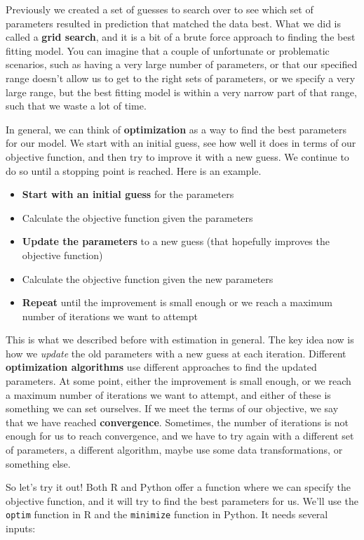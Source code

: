 \documentclass[
  letterpaper,
]{krantz}
\providecommand{\tightlist}{%
  \setlength{\itemsep}{0pt}\setlength{\parskip}{0pt}}\usepackage{longtable,booktabs,array}
\begin{document}
Previously we created a set of guesses to search over to see which set
of parameters resulted in prediction that matched the data best. What we
did is called a \textbf{grid search}, and it is a bit of a brute force
approach to finding the best fitting model. You can imagine that a
couple of unfortunate or problematic scenarios, such as having a very
large number of parameters, or that our specified range doesn't allow us
to get to the right sets of parameters, or we specify a very large
range, but the best fitting model is within a very narrow part of that
range, such that we waste a lot of time.

In general, we can think of \textbf{optimization} as a way to find the
best parameters for our model. We start with an initial guess, see how
well it does in terms of our objective function, and then try to improve
it with a new guess. We continue to do so until a stopping point is
reached. Here is an example.

\begin{itemize}
\tightlist
\item
  \textbf{Start with an initial guess} for the parameters
\item
  Calculate the objective function given the parameters
\item
  \textbf{Update the parameters} to a new guess (that hopefully improves
  the objective function)
\item
  Calculate the objective function given the new parameters
\item
  \textbf{Repeat} until the improvement is small enough or we reach a
  maximum number of iterations we want to attempt
\end{itemize}

This is what we described before with estimation in general. The key
idea now is how we \emph{update} the old parameters with a new guess at
each iteration. Different \textbf{optimization algorithms} use different
approaches to find the updated parameters. At some point, either the
improvement is small enough, or we reach a maximum number of iterations
we want to attempt, and either of these is something we can set
ourselves. If we meet the terms of our objective, we say that we have
reached \textbf{convergence}. Sometimes, the number of iterations is not
enough for us to reach convergence, and we have to try again with a
different set of parameters, a different algorithm, maybe use some data
transformations, or something else.

So let's try it out! Both R and Python offer a function where we can
specify the objective function, and it will try to find the best
parameters for us. We'll use the \texttt{optim} function in R and the
\texttt{minimize} function in Python. It needs several inputs:
\end{document}
